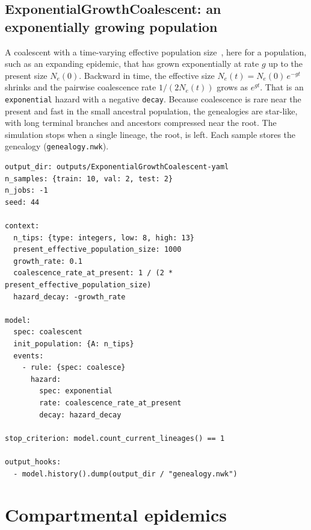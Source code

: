 \documentclass[11pt]{article}
\begin{document}
\subsection{ExponentialGrowthCoalescent: an exponentially growing population}
\label{ex:expcoal}

A coalescent with a time-varying effective population
size~\citep{griffiths1994varying, slatkin1991pairwise}, here for a population,
such as an expanding epidemic, that has grown exponentially at rate $g$ up to
the present size $N_e(0)$. Backward in time, the effective size $N_e(t) =
  N_e(0)\,e^{-gt}$ shrinks and the pairwise coalescence rate $1/(2N_e(t))$ grows
as $e^{gt}$. That is an \texttt{exponential} hazard with a negative
\texttt{decay}. Because coalescence is rare near the present and fast in the
small ancestral population, the genealogies are star-like, with long terminal
branches and ancestors compressed near the root. The simulation stops when a
single lineage, the root, is left. Each sample stores the genealogy
(\texttt{genealogy.nwk}).

\begin{lstlisting}[style=cfg]
output_dir: outputs/ExponentialGrowthCoalescent-yaml
n_samples: {train: 10, val: 2, test: 2}
n_jobs: -1
seed: 44

context:
  n_tips: {type: integers, low: 8, high: 13}
  present_effective_population_size: 1000
  growth_rate: 0.1
  coalescence_rate_at_present: 1 / (2 * present_effective_population_size)
  hazard_decay: -growth_rate

model:
  spec: coalescent
  init_population: {A: n_tips}
  events:
    - rule: {spec: coalesce}
      hazard:
        spec: exponential
        rate: coalescence_rate_at_present
        decay: hazard_decay

stop_criterion: model.count_current_lineages() == 1

output_hooks:
  - model.history().dump(output_dir / "genealogy.nwk")
\end{lstlisting}

\section{Compartmental epidemics}
\label{sec:epidemic-models}
\end{document}
